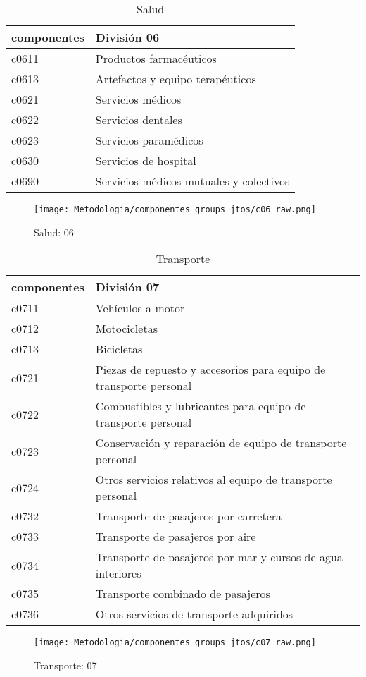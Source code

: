 \documentclass[12pt]{article}
\begin{document}
\begin{table}[h!]
\caption{Salud}
\label{tab:compo_06}
\begin{tabular}{l m{10cm}}
\toprule
componentes & División 06 \\
\midrule
c0611 & Productos farmacéuticos \\
c0613 & Artefactos y equipo terapéuticos \\
c0621 & Servicios médicos \\
c0622 & Servicios dentales \\
c0623 & Servicios paramédicos \\
c0630 & Servicios de hospital \\
c0690 & Servicios médicos mutuales y colectivos \\
\bottomrule
\end{tabular}
\end{table}
\begin{figure}[h!]
    \caption{Salud: 06}
    \label{fig:c06_raw}
    \centering
    \texttt{[image: Metodologia/componentes\_groups\_jtos/c06\_raw.png]}
\end{figure}

\clearpage
\begin{table}[h!]
\caption{Transporte}
\label{tab:compo_07}
\begin{tabular}{l m{10cm}}
\toprule
componentes & División 07 \\
\midrule
c0711 & Vehículos a motor \\
c0712 & Motocicletas \\
c0713 & Bicicletas \\
c0721 & Piezas de repuesto y accesorios para equipo de transporte personal \\
c0722 & Combustibles y lubricantes para equipo de transporte personal \\
c0723 & Conservación y reparación de equipo de transporte personal \\
c0724 & Otros servicios relativos al equipo de transporte personal \\
c0732 & Transporte de pasajeros por carretera \\
c0733 & Transporte de pasajeros por aire \\
c0734 & Transporte de pasajeros por mar y cursos de agua interiores \\
c0735 & Transporte combinado de pasajeros \\
c0736 & Otros servicios de transporte adquiridos \\
\bottomrule
\end{tabular}
\end{table}
\begin{figure}[h!]
    \caption{Transporte: 07}
    \label{fig:c07_raw}
    \centering
    \texttt{[image: Metodologia/componentes\_groups\_jtos/c07\_raw.png]}
\end{figure}
\end{document}
